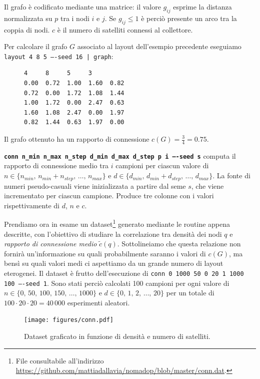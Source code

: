 \documentclass[a4paper,11pt]{article}
\theoremstyle{definition}
\begin{document}
Il grafo è codificato mediante una matrice: il valore $g_{ij}$ esprime la distanza normalizzata su $p$ tra i nodi $i$ e $j$. Se $g_{ij} \leq 1$ è perciò presente un arco tra la coppia di nodi. $c$ è il numero di satelliti connessi al collettore.

Per calcolare il grafo $G$ associato al layout dell'esempio precedente eseguiamo \texttt{layout 4 8 5 ----seed 16 | graph}:

\begin{figure}[H]
\centering
\begin{BVerbatim}
4     8     5     3
0.00  0.72  1.00  1.60  0.82 
0.72  0.00  1.72  1.08  1.44 
1.00  1.72  0.00  2.47  0.63 
1.60  1.08  2.47  0.00  1.97 
0.82  1.44  0.63  1.97  0.00 
\end{BVerbatim}
\end{figure}

Il grafo ottenuto ha un rapporto di connessione $c(G) = \frac{3}{4} = 0.75$.

\texttt{\textbf{conn n\_min n\_max n\_step d\_min d\_max d\_step p i ----seed s}} computa il rapporto di connessione medio tra $i$ campioni per ciascun valore di $n \in \{n_{min},\,n_{min}+n_{step},\,\dots,\,n_{max}\}$ e $d \in \{d_{min},\,d_{min}+d_{step},\,\dots,\,d_{max}\}$. La fonte di numeri pseudo-casuali viene inizializzata a partire dal seme $s$, che viene incrementato per ciascun campione. Produce tre colonne con i valori rispettivamente di $d$, $n$ e $c$.

Prendiamo ora in esame un dataset\footnote{File consultabile all'indirizzo \url{https://github.com/mattiadallavia/nomadop/blob/master/conn.dat}.} generato mediante le routine appena descritte, con l'obiettivo di studiare la correlazione tra densità dei nodi $q$ e \emph{rapporto di connessione medio} $\tilde{c}(q)$. Sottolineiamo che questa relazione non fornirà un'informazione su quali probabilmente saranno i valori di $c(G)$, ma bensì su quali valori medi ci aspettiamo da un grande numero di layout eterogenei. Il dataset è frutto dell'esecuzione di \texttt{conn 0 1000 50 0 20 1 1000 100 ----seed 1}. Sono stati perciò calcolati 100 campioni per ogni valore di $n \in \{0,\,50,\,100,\,150,\,\dots,\,1000\}$ e $d \in \{0,\,1,\,2,\,\dots,\,20\}$ per un totale di $100 \cdot 20 \cdot 20 = 40\,000$ esperimenti aleatori.

\begin{figure}[H]
\centering
\texttt{[image: figures/conn.pdf]}
\caption{Dataset graficato in funzione di densità e numero di satelliti.}
\end{figure}
\end{document}
